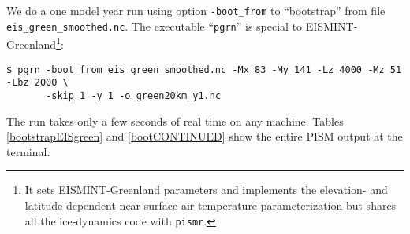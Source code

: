 We do a one model year run using option \texttt{-boot_from} to ``bootstrap'' from file \texttt{eis_green_smoothed.nc}.  The executable ``\texttt{pgrn}'' is special to EISMINT-Greenland\footnote{It sets EISMINT-Greenland parameters and implements the elevation- and latitude-dependent near-surface air temperature parameterization but shares all the ice-dynamics code with \texttt{pismr}.}:
\begin{verbatim}
$ pgrn -boot_from eis_green_smoothed.nc -Mx 83 -My 141 -Lz 4000 -Mz 51 -Lbz 2000 \
       -skip 1 -y 1 -o green20km_y1.nc
\end{verbatim}%
\noindent The run takes only a few seconds of real time on any machine.  Tables \ref{bootstrapEISgreen} and \ref{bootCONTINUED} show the entire PISM output at the terminal.

